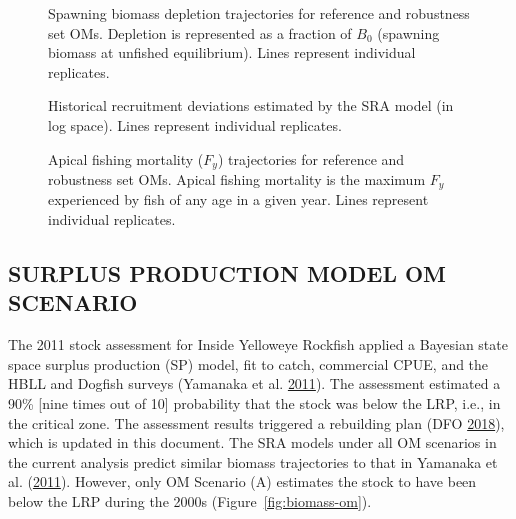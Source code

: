 \documentclass[11pt]{book}
\begin{document}
\begin{figure}[htb]

{\centering {} 

}

\caption{Spawning biomass depletion trajectories for reference and robustness set OMs. Depletion is represented as a fraction of \(B_0\) (spawning biomass at unfished equilibrium). Lines represent individual replicates.}\label{fig:depletion-om}
\end{figure}

\begin{figure}[htb]

{\centering {} 

}

\caption{Historical recruitment deviations estimated by the SRA model (in log space). Lines represent individual replicates.}\label{fig:recdev-om}
\end{figure}

\begin{figure}[htb]

{\centering {} 

}

\caption{Apical fishing mortality (\(F_y\)) trajectories for reference and robustness set OMs. Apical fishing mortality is the maximum \(F_y\) experienced by fish of any age in a given year. Lines represent individual replicates.}\label{fig:F-om}
\end{figure}
\clearpage

\hypertarget{surplus-production-model-om-scenario}{%
\subsection{SURPLUS PRODUCTION MODEL OM SCENARIO}\label{surplus-production-model-om-scenario}}

The 2011 stock assessment for Inside Yelloweye Rockfish applied a Bayesian state space surplus production (SP) model, fit to catch, commercial CPUE, and the HBLL and Dogfish surveys (Yamanaka et al. \protect\hyperlink{ref-yamanaka2011}{2011}). The assessment estimated a 90\% {[}nine times out of 10{]} probability that the stock was below the LRP, i.e., in the critical zone. The assessment results triggered a rebuilding plan (DFO \protect\hyperlink{ref-ifmp2018}{2018}), which is updated in this document. The SRA models under all OM scenarios in the current analysis predict similar biomass trajectories to that in Yamanaka et al. (\protect\hyperlink{ref-yamanaka2011}{2011}). However, only OM Scenario (A) estimates the stock to have been below the LRP during the 2000s (Figure~\ref{fig:biomass-om}).
\end{document}
